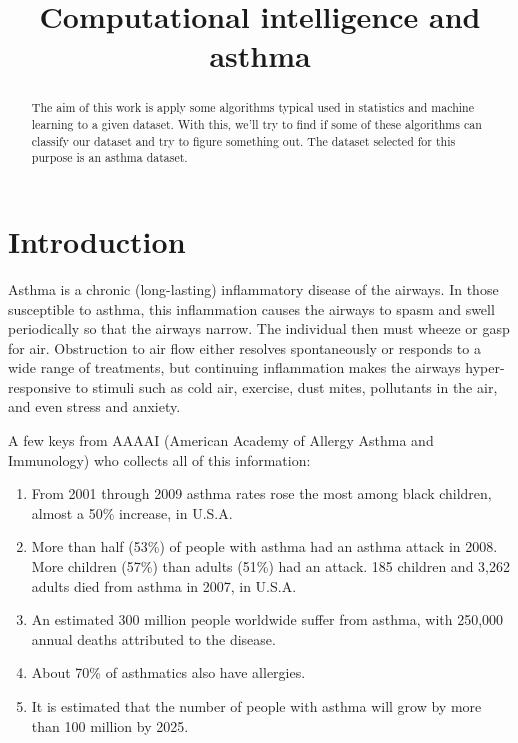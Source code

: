 \documentclass[conference,a4paper]{IEEEtran}
\title{Computational intelligence and asthma}
\author{\IEEEauthorblockN{Pablo Vicente-Munuera}
	\IEEEauthorblockA{Bioinformatics MSc\\
		Email: pablovm1990@gmail.com}
}
\begin{document}
\maketitle

\begin{abstract}

The aim of this work is apply some algorithms typical used in statistics and machine learning to a given dataset. With this, we'll try to find if some of these algorithms can classify our dataset and try to figure something out. The dataset selected for this purpose is an asthma dataset.

\end{abstract}

\section{Introduction}

Asthma is a chronic (long-lasting) inflammatory disease of the airways. In those susceptible to asthma, this inflammation causes the airways to spasm and swell periodically so that the airways narrow. The individual then must wheeze or gasp for air. Obstruction to air flow either resolves spontaneously or responds to a wide range of treatments, but continuing inflammation makes the airways hyper-responsive to stimuli such as cold air, exercise, dust mites, pollutants in the air, and even stress and anxiety.

A few keys from AAAAI (American Academy of Allergy Asthma and Immunology)\cite{AAAAI} who collects all of this information:

\begin{enumerate}
	\item From 2001 through 2009 asthma rates rose the most among black children, almost a 50\% increase, in U.S.A. \cite{asthmaUSA}
	
	\item More than half (53\%) of people with asthma had an asthma attack in 2008. More children (57\%) than adults (51\%) had an attack. 185 children and 3,262 adults died from asthma in 2007, in U.S.A. \cite{asthmaUSA}

	\item An estimated 300 million people worldwide suffer from asthma, with 250,000 annual deaths attributed to the disease.\cite{asthmaGlobal}
	
	\item About 70\% of asthmatics also have allergies.\cite{asthmaGlobal}
	
	\item It is estimated that the number of people with asthma will grow by more than 100 million by 2025. \cite{asthmaGlobal}
\end{enumerate}
\end{document}
